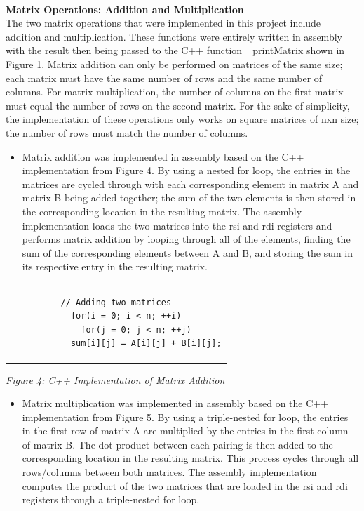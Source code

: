 \documentclass[twoside]{article}
\begin{document}
\noindent \\ \textbf{Matrix Operations: Addition and Multiplication}
\\The two matrix operations that were implemented in this project include addition and multiplication. These functions were entirely written in assembly with the result then being passed to the C++ function \_printMatrix shown in Figure 1. Matrix addition can only be performed on matrices of the same size; each matrix must have the same number of rows and the same number of columns. For matrix multiplication, the number of columns on the first matrix must equal the number of rows on the second matrix. For the sake of simplicity, the implementation of these operations only works on square matrices of nxn size; the number of rows must match the number of columns.\\
\begin{itemize}
\item Matrix addition was implemented in assembly based on the C++ implementation from Figure 4. By using a nested for loop, the entries in the matrices are cycled through with each corresponding element in matrix A and matrix B being added together; the sum of the two elements is then stored in the corresponding location in the resulting matrix. The assembly implementation loads the two matrices into the rsi and rdi registers and performs matrix addition by looping through all of the elements, finding the sum of the corresponding elements between A and B, and storing the sum in its respective entry in the resulting matrix.
\end{itemize}
\begin{center} \begin{tabular}{c} \begin{lstlisting}
// Adding two matrices
    for(i = 0; i < n; ++i)
        for(j = 0; j < n; ++j)
            sum[i][j] = A[i][j] + B[i][j];
\end{lstlisting} \end{tabular} \end{center}
\begin{center}\textit{Figure 4: C++ Implementation of Matrix Addition}\end{center}
\begin{itemize}
\item Matrix multiplication was implemented in assembly based on the C++ implementation from Figure 5. By using a triple-nested for loop, the entries in the first row of matrix A are multiplied by the entries in the first column of matrix B. The dot product between each pairing is then added to the corresponding location in the resulting matrix. This process cycles through all rows/columns between both matrices. The assembly implementation computes the product of the two matrices that are loaded in the rsi and rdi registers through a triple-nested for loop.
\end{itemize}
\end{document}
